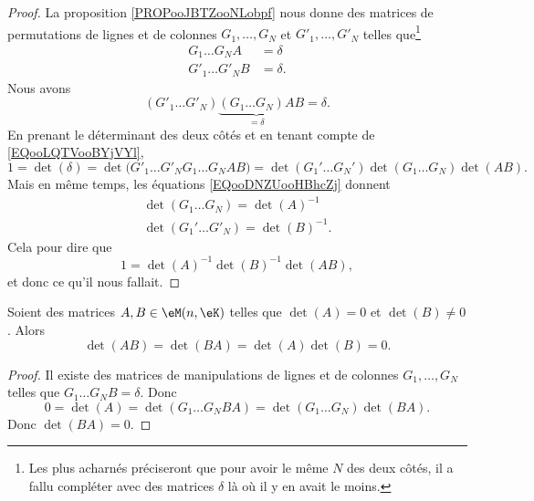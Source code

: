 \begin{proof}
	La proposition \ref{PROPooJBTZooNLobpf} nous donne des matrices de permutations de lignes et de colonnes \( G_1,\ldots, G_N\) et \( G'_1,\ldots, G'_N\) telles que\footnote{Les plus acharnés préciseront que pour avoir le même \( N\) des deux côtés, il a fallu compléter avec des matrices \( \delta\) là où il y en avait le moins.}
	\begin{subequations}        \label{EQooDNZUooHBhcZj}
		\begin{align}
			G_1\ldots G_NA   & =\delta  \\
			G'_1\ldots G'_NB & =\delta.
		\end{align}
	\end{subequations}
	Nous avons
	\begin{equation}
		(G'_1\ldots G'_N)\underbrace{(G_1\ldots G_N)A}_{=\delta}B=\delta.
	\end{equation}
	En prenant le déterminant des deux côtés et en tenant compte de \eqref{EQooLQTVooBYjVYl},
	\begin{equation}
		1=\det(\delta)=\det\big(  G'_1\ldots G'_NG_1\ldots G_NAB\big)=\det(G_1'\ldots G_N')\det(G_1\ldots G_N)\det(AB).
	\end{equation}
	Mais en même temps, les équations \ref{EQooDNZUooHBhcZj} donnent
	\begin{subequations}
		\begin{align}
			\det(G_1 \ldots G_N)  =\det(A)^{-1} \\
			\det(G_1'\ldots G'_N) =\det(B)^{-1}.
		\end{align}
	\end{subequations}
	Cela pour dire que
	\begin{equation}
		1=\det(A)^{-1}\det(B)^{-1}\det(AB),
	\end{equation}
	et donc ce qu'il nous fallait.
\end{proof}

\begin{proposition}     \label{PROPooWVJFooTmqoec}
	Soient des matrices \( A,B\in \eM(n,\eK)\) telles que \( \det(A)=0\) et \( \det(B)\neq0\). Alors
	\begin{equation}
		\det(AB)=\det(BA)=\det(A)\det(B)=0.
	\end{equation}
\end{proposition}

\begin{proof}
	Il existe des matrices de manipulations de lignes et de colonnes \( G_1,\ldots, G_N\) telles que \( G_1\ldots G_NB=\delta\). Donc
	\begin{equation}
		0=\det(A)=\det(G_1\ldots G_NBA)=\det(G_1\ldots G_N)\det(BA).
	\end{equation}
	Donc \( \det(BA)=0\).
\end{proof}

